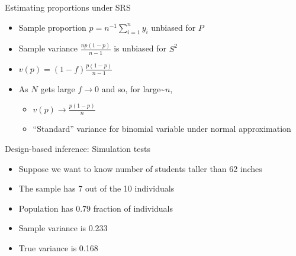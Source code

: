 \documentclass[
  ignorenonframetext,
]{beamer}
\providecommand{\tightlist}{%
  \setlength{\itemsep}{0pt}\setlength{\parskip}{0pt}}
\begin{document}
\begin{frame}{Estimating proportions under SRS}
\protect\hypertarget{estimating-proportions-under-srs-1}{}

\begin{itemize}
\tightlist
\item
  Sample proportion \(p = n^{-1} \sum_{i=1}^n y_i\) unbiased for \(P\)
\item
  Sample variance \(\frac{n p (1-p)}{n-1}\) is unbiased for \(S^2\)
\item
  \(v(p) = (1-f) \frac{p (1-p)}{n-1}\)
\item
  As \(N\) gets large \(f \to 0\) and so, for
  large\textasciitilde{}\(n\),

  \begin{itemize}
  \tightlist
  \item
    \(v(p) \to \frac{p(1-p)}{n}\)
  \item
    ``Standard'' variance for binomial variable under normal
    approximation
  \end{itemize}
\end{itemize}

\end{frame}

\begin{frame}{Design-based inference: Simulation tests}
\protect\hypertarget{design-based-inference-simulation-tests-1}{}

\begin{itemize}
\tightlist
\item
  Suppose we want to know number of students taller than 62 inches
\item
  The sample has 7 out of the 10 individuals
\item
  Population has 0.79 fraction of individuals
\item
  Sample variance is 0.233
\item
  True variance is 0.168
\end{itemize}

\end{frame}
\end{document}
